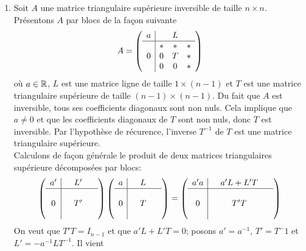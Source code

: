 \begin{enumerate}[(1)]
  \item Soit $A$ une matrice triangulaire supérieure inversible de taille $n\times n$. Présentons $A$ par blocs de la façon suivante
    $$A = \left( \begin{array}{c|ccc}
      a &   & L &   \\ \hline
        & * & * & * \\
      0 & 0 & T & * \\
        & 0 & 0 & * \\
    \end{array} \right)$$
    où $a \in \mathbb{R}$, $L$ est une matrice ligne de taille $1 \times (n-1)$ et $T$ est une matrice triangulaire supérieure de taille $(n-1)\times(n-1)$. Du fait que $A$ est inversible, tous ses coefficients diagonaux sont non nuls. Cela implique que $a \neq 0$ et que les coefficients diagonaux de $T$ sont non nuls, donc $T$ est inversible. Par l'hypothèse de récurence, l'inverse $T^{-1}$ de $T$ est une matrice triangulaire supérieure. \\
    Calculons de façon générale le produit de deux matrices triangulaires supérieure décomposées par blocs:
    $$\left( \begin{array}{c|ccc}
        a' &   & L' & ~ \\ \hline
          &   &   &  ~  \\
        0 &   & T' & ~  \\
          &   &   &  ~ \\
      \end{array} \right)
      \left( \begin{array}{c|ccc}
        a &   & L &  ~ \\ \hline
          &   &   &  ~ \\
        0 &   & T &  ~ \\
          &   &   &  ~ \\
      \end{array} \right)
      =\left( \begin{array}{c|ccc}
        a' a &   & a' L + L' T & ~ \\ \hline
          &   &   & ~ \\
        0 &   & T' T & ~ \\
          &   &   & ~ \\
      \end{array} \right)$$
    On veut que $T' T = I_{n-1}$ et que $a' L + L' T = 0$; posons $a' = a^{-1}$, $T' = T^-{1}$ et $L' = - a^{-1} L T^{-1}$. Il vient
    \begin{eqnarray*}

\end{eqnarray*}
\end{enumerate}
